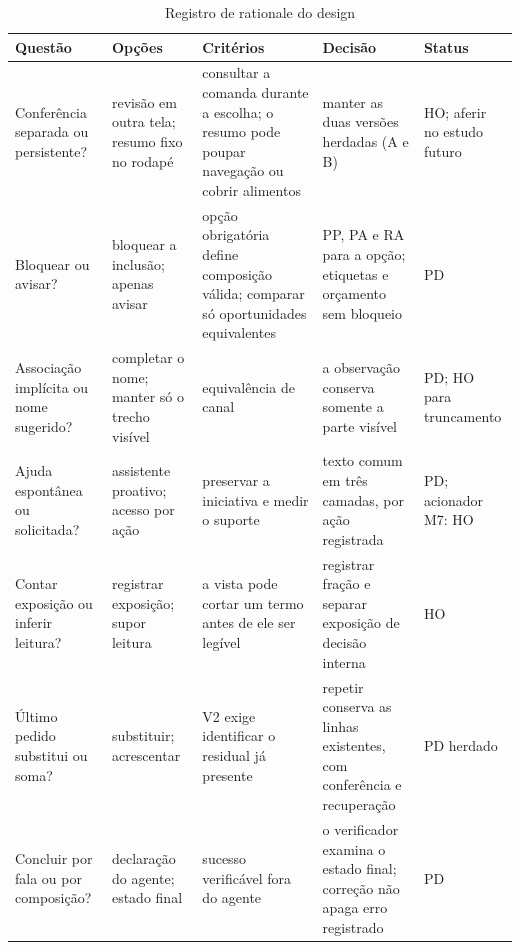 \begin{table}[!t]
\caption{Registro de rationale do design}
\label{tab:rationale}
\centering\scriptsize\setlength{\tabcolsep}{3pt}\renewcommand{\arraystretch}{1.1}
\begin{tabularx}{\textwidth}{@{}>{\raggedright\arraybackslash}p{}>{\raggedright\arraybackslash}p{}>{\raggedright\arraybackslash}X>{\raggedright\arraybackslash}p{}>{\raggedright\arraybackslash}p{}@{}}
\hline \textbf{Questão} & \textbf{Opções} & \textbf{Critérios} & \textbf{Decisão} & \textbf{Status}\\ \hline
Conferência separada ou persistente? & revisão em outra tela; resumo fixo no rodapé & consultar a comanda durante a escolha; o resumo pode poupar navegação ou cobrir alimentos & manter as duas versões herdadas (A e B) & HO; aferir no estudo futuro\\
Bloquear ou avisar? & bloquear a inclusão; apenas avisar & opção obrigatória define composição válida; comparar só oportunidades equivalentes & PP, PA e RA para a opção; etiquetas e orçamento sem bloqueio & PD\\
Associação implícita ou nome sugerido? & completar o nome; manter só o trecho visível & equivalência de canal & a observação conserva somente a parte visível & PD; HO para truncamento\\
Ajuda espontânea ou solicitada? & assistente proativo; acesso por ação & preservar a iniciativa e medir o suporte & texto comum em três camadas, por ação registrada & PD; acionador M7: HO\\
Contar exposição ou inferir leitura? & registrar exposição; supor leitura & a vista pode cortar um termo antes de ele ser legível & registrar fração e separar exposição de decisão interna & HO\\
Último pedido substitui ou soma? & substituir; acrescentar & V2 exige identificar o residual já presente & repetir conserva as linhas existentes, com conferência e recuperação & PD herdado\\
Concluir por fala ou por composição? & declaração do agente; estado final & sucesso verificável fora do agente & o verificador examina o estado final; correção não apaga erro registrado & PD\\ \hline
\end{tabularx}
\end{table}
